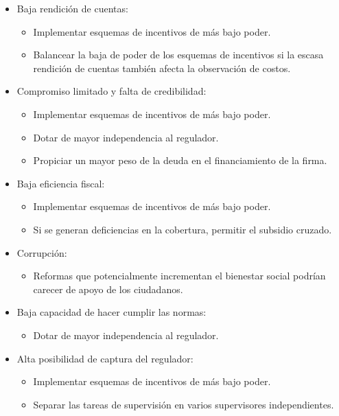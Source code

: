 \documentclass[
  12pt,
  spanish,
]{book}
\providecommand{\tightlist}{%
  \setlength{\itemsep}{0pt}\setlength{\parskip}{0pt}}
\begin{document}
\begin{itemize}
\tightlist
\item
  Baja rendición de cuentas:

  \begin{itemize}
  \tightlist
  \item
    Implementar esquemas de incentivos de más bajo poder.
  \item
    Balancear la baja de poder de los esquemas de incentivos si la
    escasa rendición de cuentas también afecta la observación de costos.
  \end{itemize}
\item
  Compromiso limitado y falta de credibilidad:

  \begin{itemize}
  \tightlist
  \item
    Implementar esquemas de incentivos de más bajo poder.
  \item
    Dotar de mayor independencia al regulador.
  \item
    Propiciar un mayor peso de la deuda en el financiamiento de la
    firma.
  \end{itemize}
\item
  Baja eficiencia fiscal:

  \begin{itemize}
  \tightlist
  \item
    Implementar esquemas de incentivos de más bajo poder.
  \item
    Si se generan deficiencias en la cobertura, permitir el subsidio
    cruzado.
  \end{itemize}
\item
  Corrupción:

  \begin{itemize}
  \tightlist
  \item
    Reformas que potencialmente incrementan el bienestar social podrían
    carecer de apoyo de los ciudadanos.
  \end{itemize}
\item
  Baja capacidad de hacer cumplir las normas:

  \begin{itemize}
  \tightlist
  \item
    Dotar de mayor independencia al regulador.
  \end{itemize}
\item
  Alta posibilidad de captura del regulador:

  \begin{itemize}
  \tightlist
  \item
    Implementar esquemas de incentivos de más bajo poder.
  \item
    Separar las tareas de supervisión en varios supervisores
    independientes.
  \end{itemize}
\end{itemize}
\end{document}
